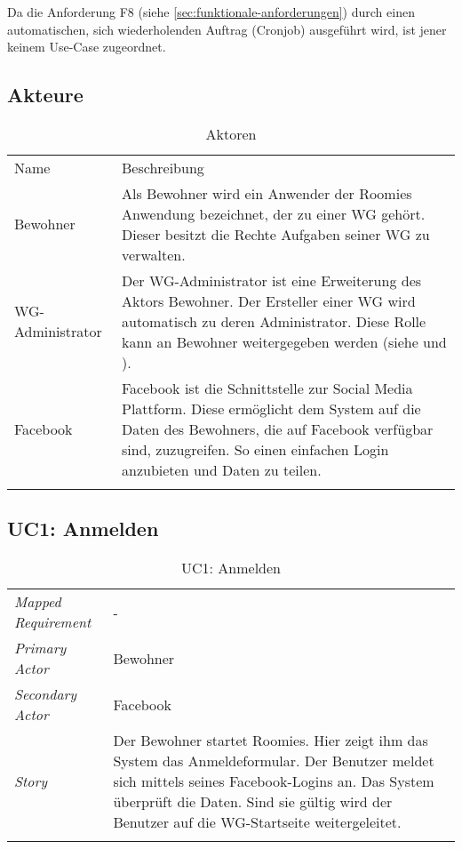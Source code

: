 Da die Anforderung F8 (siehe \ref{sec:funktionale-anforderungen}) durch einen automatischen, sich wiederholenden Auftrag (\gls{Cronjob}) ausgeführt wird, ist jener keinem Use-Case zugeordnet.

\subsection{Akteure}
\begin{table}[H]
	\tablestyle
	\tablealtcolored
	\begin{tabularx}{\textwidth}{lX}
		\tableheadcolor
		\tablehead Name &
		\tablehead Beschreibung \tabularnewline
		\tablebody
			Bewohner &
			Als Bewohner wird ein Anwender der Roomies Anwendung bezeichnet, der zu einer WG gehört. \newline
			Dieser besitzt die Rechte Aufgaben seiner WG zu verwalten.
			\tabularnewline
			WG-Administrator &
			Der WG-Administrator ist eine Erweiterung des Aktors Bewohner. Der Ersteller einer WG wird automatisch zu deren Administrator. Diese Rolle kann an Bewohner weitergegeben werden (siehe \nameref{subsec:uc4} und \nameref{subsec:uc10}).
			\tabularnewline
			Facebook &
			Facebook ist die Schnittstelle zur Social Media Plattform. Diese ermöglicht dem System auf die Daten des Bewohners, die auf Facebook verfügbar sind, zuzugreifen. So einen einfachen Login anzubieten und Daten zu teilen.
			\tabularnewline
		\tableend
	\end{tabularx}
	\caption{Aktoren}
\end{table}

\subsection{UC1: Anmelden}\label{subsec:uc1}
\begin{table}[H]
	\tablestyle
	\tablealtcolored
	\begin{tabularx}{\textwidth}{lX}
		\tablebody
			\textit{Mapped Requirement} &
			-
			\tabularnewline
			\textit{Primary Actor} &
			Bewohner
			\tabularnewline
			\textit{Secondary Actor} &
			Facebook
			\tabularnewline
			\textit{Story} &
			Der Bewohner startet Roomies. Hier zeigt ihm das System das Anmeldeformular. Der Benutzer meldet sich mittels seines Facebook-Logins an. Das System überprüft die Daten. Sind sie gültig wird der Benutzer auf die WG-Startseite weitergeleitet.
			\tabularnewline
		\tableend
	\end{tabularx}
	\caption{UC1: Anmelden}
\end{table}


